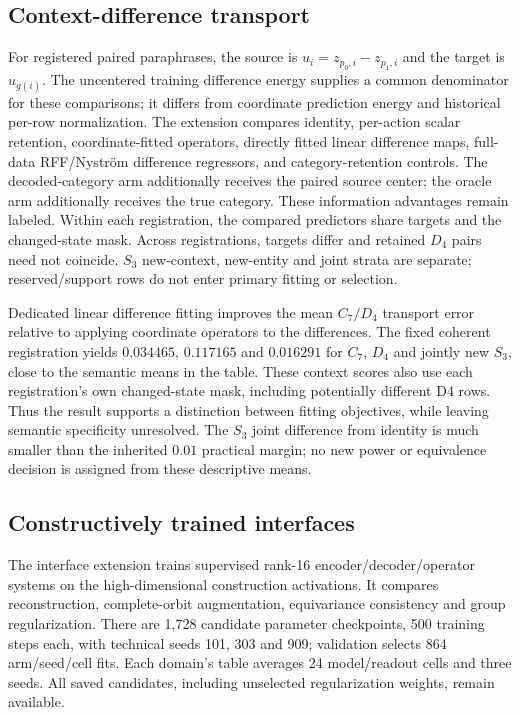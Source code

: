 \subsection{Context-difference transport}

For registered paired paraphrases, the source is $u_i=z_{p_0,i}-z_{p_1,i}$ and the target is $u_{g(i)}$. The uncentered training difference energy supplies a common denominator for these comparisons; it differs from coordinate prediction energy and historical per-row normalization. The extension compares identity, per-action scalar retention, coordinate-fitted operators, directly fitted linear difference maps, full-data RFF/Nystr\"om difference regressors, and category-retention controls. The decoded-category arm additionally receives the paired source center; the oracle arm additionally receives the true category. These information advantages remain labeled. Within each registration, the compared predictors share targets and the changed-state mask. Across registrations, targets differ and retained $D_4$ pairs need not coincide. $S_3$ new-context, new-entity and joint strata are separate; reserved/support rows do not enter primary fitting or selection.

Dedicated linear difference fitting improves the mean $C_7/D_4$ transport error relative to applying coordinate operators to the differences. The fixed coherent registration yields $0.034465$, $0.117165$ and $0.016291$ for $C_7$, $D_4$ and jointly new $S_3$, close to the semantic means in the table. These context scores also use each registration's own changed-state mask, including potentially different D4 rows. Thus the result supports a distinction between fitting objectives, while leaving semantic specificity unresolved. The $S_3$ joint difference from identity is much smaller than the inherited $0.01$ practical margin; no new power or equivalence decision is assigned from these descriptive means.

\subsection{Constructively trained interfaces}

The interface extension trains supervised rank-16 encoder/decoder/operator systems on the high-dimensional construction activations. It compares reconstruction, complete-orbit augmentation, equivariance consistency and group regularization. There are 1,728 candidate parameter checkpoints, 500 training steps each, with technical seeds 101, 303 and 909; validation selects 864 arm/seed/cell fits. Each domain's table averages 24 model/readout cells and three seeds. All saved candidates, including unselected regularization weights, remain available.

